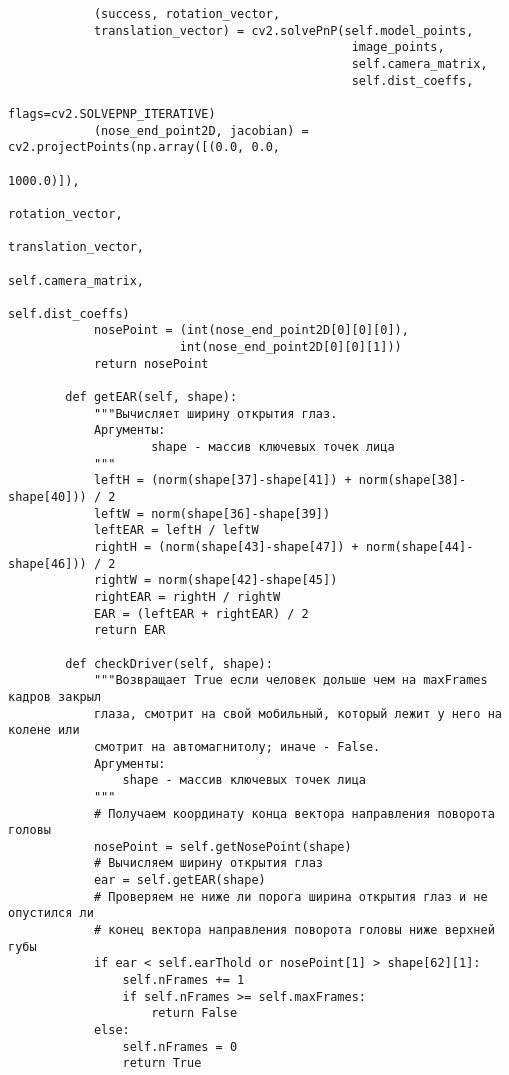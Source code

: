 \begin{verbatim}
            (success, rotation_vector,
            translation_vector) = cv2.solvePnP(self.model_points,
                                                image_points,
                                                self.camera_matrix,
                                                self.dist_coeffs,
                                                flags=cv2.SOLVEPNP_ITERATIVE)
            (nose_end_point2D, jacobian) = cv2.projectPoints(np.array([(0.0, 0.0,
                                                                        1000.0)]),
                                                            rotation_vector,
                                                            translation_vector,
                                                            self.camera_matrix,
                                                            self.dist_coeffs)
            nosePoint = (int(nose_end_point2D[0][0][0]),
                        int(nose_end_point2D[0][0][1]))
            return nosePoint

        def getEAR(self, shape):
            """Вычисляет ширину открытия глаз.
            Аргументы:
                    shape - массив ключевых точек лица
            """
            leftH = (norm(shape[37]-shape[41]) + norm(shape[38]-shape[40])) / 2
            leftW = norm(shape[36]-shape[39])
            leftEAR = leftH / leftW
            rightH = (norm(shape[43]-shape[47]) + norm(shape[44]-shape[46])) / 2
            rightW = norm(shape[42]-shape[45])
            rightEAR = rightH / rightW
            EAR = (leftEAR + rightEAR) / 2
            return EAR

        def checkDriver(self, shape):
            """Возвращает True если человек дольше чем на maxFrames кадров закрыл
            глаза, смотрит на свой мобильный, который лежит у него на колене или
            смотрит на автомагнитолу; иначе - False.
            Аргументы:
                shape - массив ключевых точек лица
            """
            # Получаем координату конца вектора направления поворота головы
            nosePoint = self.getNosePoint(shape)
            # Вычисляем ширину открытия глаз
            ear = self.getEAR(shape)
            # Проверяем не ниже ли порога ширина открытия глаз и не опустился ли
            # конец вектора направления поворота головы ниже верхней губы
            if ear < self.earThold or nosePoint[1] > shape[62][1]:
                self.nFrames += 1
                if self.nFrames >= self.maxFrames:
                    return False
            else:
                self.nFrames = 0
                return True



\end{verbatim}
